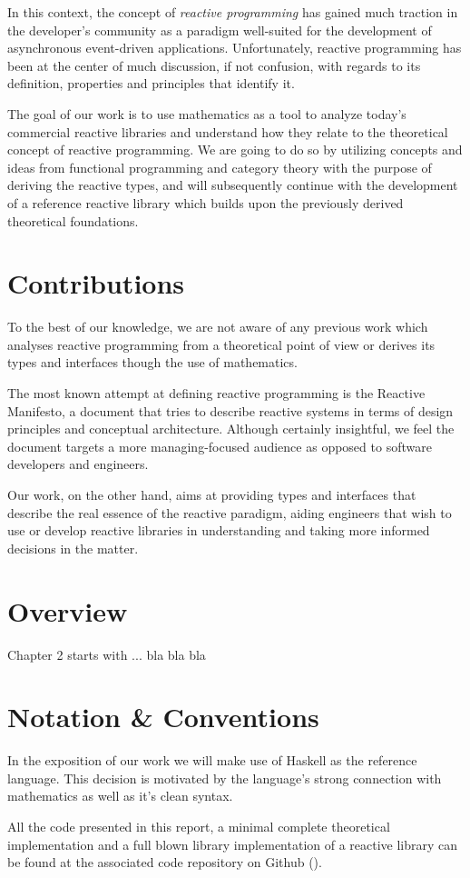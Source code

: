 In this context, the concept of \textit{reactive programming} has gained much traction in the developer's community as a paradigm well-suited for the development of asynchronous  event-driven applications\cite{bainomugisha2013survey}. Unfortunately, reactive programming has been at the center of much discussion, if not confusion, with regards to its definition, properties and principles that identify it\cite{meijer2014reactive}.

The goal of our work is to use mathematics as a tool to analyze today's commercial reactive libraries and understand how they relate to the theoretical concept of reactive programming.  We are going to do so by utilizing concepts and ideas from functional programming and category theory with the purpose of deriving the reactive types, and will subsequently continue with the development of a reference reactive library which builds upon the previously derived theoretical foundations. 

\section*{Contributions}

To the best of our knowledge, we are not aware of any previous work which analyses reactive programming from a theoretical point of view or derives its types and interfaces though the use of mathematics.

The most known attempt at defining reactive programming is the Reactive Manifesto\cite{reactive-manifesto}, a document that tries to describe reactive systems in terms of design principles and conceptual architecture. Although certainly insightful, we feel the document targets a more managing-focused audience as opposed to software developers and engineers. 

Our work, on the other hand, aims at providing types and interfaces that describe the real essence of the reactive paradigm, aiding engineers that wish to use or develop reactive libraries in understanding and taking more informed decisions in the matter.

\section*{Overview}

Chapter 2 starts with ... bla bla bla


\section*{Notation \& Conventions}

In the exposition of our work we will make use of Haskell as the reference language. This decision is motivated by the language's strong connection with mathematics as well as it's clean syntax.

All the code presented in this report, a minimal complete theoretical implementation and a full blown library implementation of a reactive library can be found at the associated code repository on Github ().


